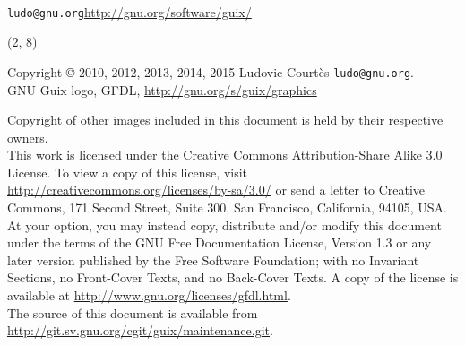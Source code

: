 \documentclass{beamer}
\begin{document}
\begin{frame}[plain]

\vfill{
  \vspace{2.5cm}
  \\[1.0cm]
  \texttt{ludo@gnu.org}\hfill{\alert{\url{http://gnu.org/software/guix/}}}
}

\end{frame}

\begin{frame}{}

  \begin{textblock}{12}(2, 8)
    \tiny{
      Copyright \copyright{} 2010, 2012, 2013, 2014, 2015 Ludovic Courtès \texttt{ludo@gnu.org}.\\[3.0mm]
      GNU Guix logo, GFDL, \url{http://gnu.org/s/guix/graphics}

      Copyright of other images included in this document is held by
      their respective owners.
      \\[3.0mm]
      This work is licensed under the \alert{Creative Commons
        Attribution-Share Alike 3.0} License.  To view a copy of this
      license, visit
      \url{http://creativecommons.org/licenses/by-sa/3.0/} or send a
      letter to Creative Commons, 171 Second Street, Suite 300, San
      Francisco, California, 94105, USA.
      \\[2.0mm]
      At your option, you may instead copy, distribute and/or modify
      this document under the terms of the \alert{GNU Free Documentation
        License, Version 1.3 or any later version} published by the Free
      Software Foundation; with no Invariant Sections, no Front-Cover
      Texts, and no Back-Cover Texts.  A copy of the license is
      available at \url{http://www.gnu.org/licenses/gfdl.html}.
      \\[2.0mm]
      The source of this document is available from
      \url{http://git.sv.gnu.org/cgit/guix/maintenance.git}.
    }
  \end{textblock}
\end{frame}
\end{document}
